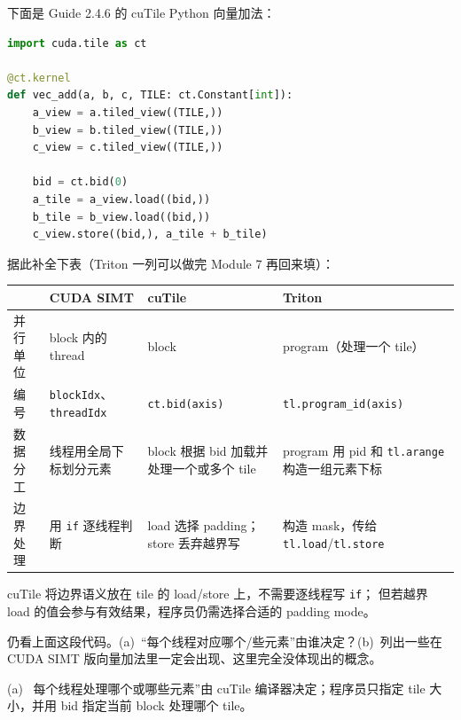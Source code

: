 \documentclass[11pt,a4paper,fontset=none]{ctexart}
\begin{document}
下面是 Guide 2.4.6 的 cuTile Python 向量加法：

\begin{lstlisting}[language=Python]
import cuda.tile as ct

@ct.kernel
def vec_add(a, b, c, TILE: ct.Constant[int]):
    a_view = a.tiled_view((TILE,))
    b_view = b.tiled_view((TILE,))
    c_view = c.tiled_view((TILE,))

    bid = ct.bid(0)
    a_tile = a_view.load((bid,))
    b_tile = b_view.load((bid,))
    c_view.store((bid,), a_tile + b_tile)
\end{lstlisting}

据此补全下表（Triton 一列可以做完 Module 7 再回来填）：

\begin{center}\small
  \begin{tabularx}{\linewidth}{@{}p{4.2em}
    >{\raggedright\arraybackslash}X
    >{\raggedright\arraybackslash}X
    >{\raggedright\arraybackslash}X@{}}
    \toprule
         & CUDA SIMT                                      & cuTile & Triton \\
    \midrule
    并行单位 & block 内的 thread
         & block
         & program（处理一个 tile）                                               \\
    编号   & \texttt{blockIdx}、\texttt{threadIdx}
         & \texttt{ct.bid(axis)}
         & \texttt{tl.program\_id}\newline\texttt{(axis)}                   \\
    数据分工 & 线程用全局下标划分元素
         & block 根据 bid 加载并处理一个或多个 tile
         & program 用 pid 和 \texttt{tl.arange} 构造一组元素下标                      \\
    边界处理 & 用 \texttt{if} 逐线程判断
         & load 选择 padding；store 丢弃越界写
         & 构造 mask，传给 \texttt{tl.load}/\texttt{tl.store}                    \\
    \bottomrule
  \end{tabularx}
\end{center}

cuTile 将边界语义放在 tile 的 load/store 上，不需要逐线程写 \texttt{if}；
但若越界 load 的值会参与有效结果，程序员仍需选择合适的 padding mode。

仍看上面这段代码。(a)~“每个线程对应哪个/些元素”由谁决定？(b)~列出一些在 CUDA SIMT 版向量加法里一定会出现、这里完全没体现出的概念。

(a)~ 每个线程处理哪个或哪些元素”由 cuTile 编译器决定；程序员只指定 tile 大小，并用 bid 指定当前 block 处理哪个 tile。
\end{document}
